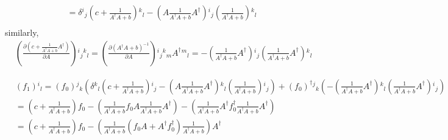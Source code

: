 \begin{tcolorbox}
\begin{equation}
\begin{split}
&=\delta {}^i{}_j  \left(c+\frac{1}{A^{\dagger}A+b}\right){}^k{}_l-\left(A\frac{1}{A^{\dagger}A+b}A^{\dagger}\right){}^i{}_j  \left(\frac{1}{A^{\dagger}A+b}\right){}^k{}_l\\
\end{split}
\end{equation}
similarly,
\begin{equation}
\begin{split}
&\left(\frac{\partial \left(c+\frac{1}{A^{\dagger}A+b}A^{\dagger}\right)}{\partial A}\right){}^i{}_j{}^k{}_l= \left(\frac{\partial \left(A^{\dagger}A+b\right)^{-1}}{\partial A}\right){}^i{}_j{}^k{}_m A^{\dagger}{}^m{}_l
 =-\left(\frac{1}{A^{\dagger}A+b}A^{\dagger}\right){}^i{}_j  \left(\frac{1}{A^{\dagger}A+b}A^{\dagger}\right){}^k{}_l
\end{split}
\end{equation}
\end{tcolorbox}

\begin{equation}
\begin{split}
&(f_1){}^i{}_l = (f_0){}^j{}_k \left(\delta {}^k{}_l  \left(c+\frac{1}{A^{\dagger}A+b}\right){}^i{}_j-\left(A\frac{1}{A^{\dagger}A+b}A^{\dagger}\right){}^k{}_l  \left(\frac{1}{A^{\dagger}A+b}\right){}^i{}_j\right) +  (f_0)^{\dagger}{}^j{}_k \left(-\left(\frac{1}{A^{\dagger}A+b}A^{\dagger}\right){}^k{}_l  \left(\frac{1}{A^{\dagger}A+b}A^{\dagger}\right){}^i{}_j\right)\\
&=\left(c+\frac{1}{A^{\dagger}A+b}\right)f_0-\left(\frac{1}{A^{\dagger}A+b}f_0A\frac{1}{A^{\dagger}A+b}A^{\dagger}\right)-\left(\frac{1}{A^{\dagger}A+b}A^{\dagger}f_0^{\dagger}\frac{1}{A^{\dagger}A+b}A^{\dagger}\right)\\
&=\left(c+\frac{1}{A^{\dagger}A+b}\right)f_0-\left(\frac{1}{A^{\dagger}A+b}\left(f_0A+A^{\dagger}f_0^{\dagger}\right)\frac{1}{A^{\dagger}A+b}\right)A^{\dagger}\\
\end{split}
\end{equation}


